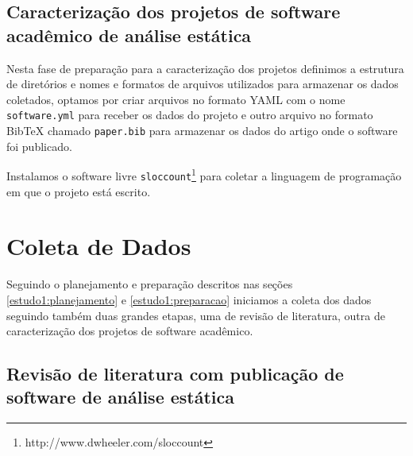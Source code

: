 \subsection{Caracterização dos projetos de software acadêmico de análise estática}

Nesta fase de preparação para a caracterização dos projetos definimos a
estrutura de diretórios e nomes e formatos de arquivos utilizados para
armazenar os dados coletados, optamos por criar arquivos no formato YAML com o
nome \texttt{software.yml} para receber os dados do projeto e outro arquivo no
formato BibTeX chamado \texttt{paper.bib} para armazenar os dados do artigo
onde o software foi publicado.


Instalamos o software livre
\texttt{sloccount}\footnote{http://www.dwheeler.com/sloccount} para coletar a
linguagem de programação em que o projeto está escrito.



\section{Coleta de Dados} \label{estudo1:coleta} %

Seguindo o planejamento e preparação descritos nas seções
\ref{estudo1:planejamento} e \ref{estudo1:preparacao} iniciamos a coleta dos
dados seguindo também duas grandes etapas, uma de revisão de literatura, outra
de caracterização dos projetos de software acadêmico.

\subsection{Revisão de literatura com publicação de software de análise estática}

